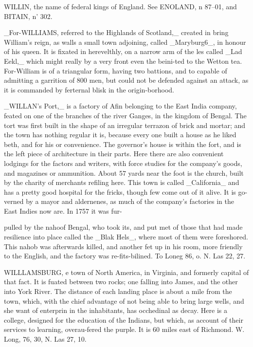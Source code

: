 WILLIN, the name of federal kings of England. See ENOLAND, n 87--01, and BITAIN, n' 302.\par\medskip
\_For-WILLIAMS, referred to the Highlands of Scotland,\_ created in bring William's reign, as walls a small town adjoining, called \_Maryburg6\_, in honour of his queen. It is fixated in herevelthly, on a narrow arm of the les called \_Lad Eekl,\_ which might really by a very front even the beini-ted to the Wetton tea. For-William is of a triangular form, having two battions, and to capable of admitting a garrition of 800 men, but could not be defended against an attack, as it is commanded by ferternal blisk in the origin-borhood.\par\medskip
\_WILLAN’s Port,\_ is a factory of Afin belonging to the East India company, feated on one of the branches of the river Ganges, in the kingdom of Bengal. The tort was first built in the shape of an irregular terrazon of brick and mortar; and the town has nothing regular it is, because every one built a house as he liked beth, and for his or convenience. The governor's house is within the fort, and is the left piece of architecture in their parts. Here there are also convenient lodgings for the factors and writers, with force studies for the company's goods, and magazines or ammunition. About 57 yards near the foot is the church, built by the charity of merchants refiling here. This town is called \_California\_ and has a pretty good hospital for the fricks, though few come out of it alive. It is go-verned by a mayor and aldernenes, as much of the company's factories in the East Indies now are. In 1757 it was fur-\par\medskip
pulled by the nahoof Bengal, who took its, and put met of those that had made resilience into place called the \_Blak Hels\_, where most of them were foreshored. This nahob was afterwards killed, and another fet up in his room, more friendly to the English, and the factory was re-fits-bilined. To Loneg 86, o. N. Las 22, 27.\par\medskip
WILLLAMSBURG, e town of North America, in Virginia, and formerly capital of that fact. It is fuated between two rocks; one falling into James, and the other into York River. The distance of each landing place is about a mile from the town, which, with the chief advantage of not being able to bring large wells, and she want of enterprin in the inhabitants, has occhedinal as decay. Here is a college, designed for the education of the Indians, but which, as account of their services to learning, overau-fered the purple. It is 60 miles east of Richmond. W. Long, 76, 30, N. Las 27, 10.\par\medskip
